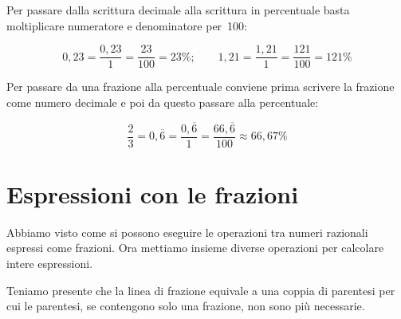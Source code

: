 Per passare dalla scrittura decimale alla scrittura in percentuale basta 
moltiplicare numeratore e denominatore per~100:

\vspace{-.5em}
\[
0,23 = \frac{0,23}{1} = \frac{23}{100} = 23\%; \qquad
1,21 = \frac{1,21}{1} = \frac{121}{100} = 121\%
\]

Per passare da una frazione alla percentuale conviene prima scrivere la 
frazione come numero decimale e poi da questo passare alla percentuale:

\vspace{-.5em}
\[\frac{2}{3} = 0,\overline{6} = \frac{0,\overline{6}}{1} = 
  \frac{66,\overline{6}}{100} \approx  66,67\%\]


\section{Espressioni con le frazioni}
\label{sec:03_espressioni}

Abbiamo visto come si possono eseguire le operazioni tra numeri razionali 
espressi come frazioni. Ora mettiamo insieme diverse operazioni per calcolare 
intere espressioni.

Teniamo presente che la linea di frazione equivale a una coppia 
di parentesi per cui le parentesi, se contengono solo una frazione, 
non sono più necessarie.

